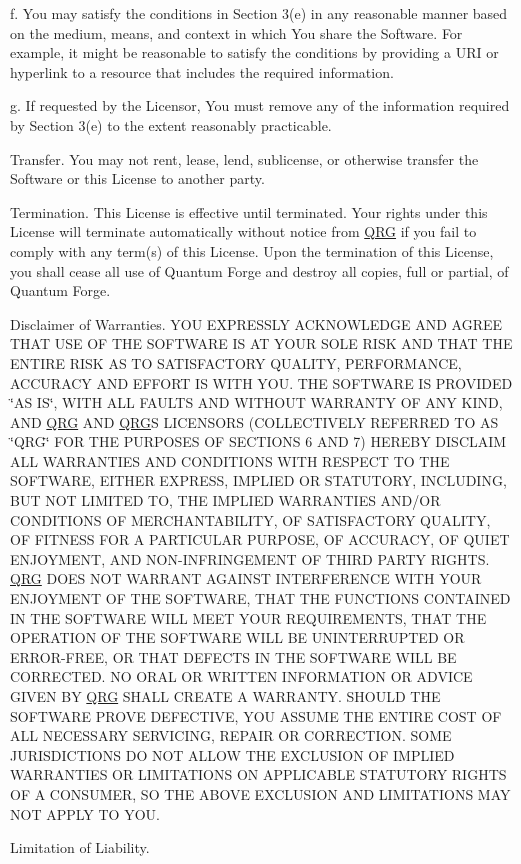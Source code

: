 f. You may satisfy the conditions in Section 3(e) in any reasonable manner based on the medium, means, and context in which You share the Software. For example, it might be reasonable to satisfy the conditions by providing a URI or hyperlink to a resource that includes the required information.

g. If requested by the Licensor, You must remove any of the information required by Section 3(e) to the extent reasonably practicable.


\begin{DoxyEnumerate}
\item Transfer. You may not rent, lease, lend, sublicense, or otherwise transfer the Software or this License to another party.
\item Termination. This License is effective until terminated. Your rights under this License will terminate automatically without notice from \mbox{\hyperlink{namespace_q_r_g}{QRG}} if you fail to comply with any term(s) of this License. Upon the termination of this License, you shall cease all use of Quantum Forge and destroy all copies, full or partial, of Quantum Forge.
\item Disclaimer of Warranties. YOU EXPRESSLY ACKNOWLEDGE AND AGREE THAT USE OF THE SOFTWARE IS AT YOUR SOLE RISK AND THAT THE ENTIRE RISK AS TO SATISFACTORY QUALITY, PERFORMANCE, ACCURACY AND EFFORT IS WITH YOU. THE SOFTWARE IS PROVIDED \char`\"{}\+AS IS\char`\"{}, WITH ALL FAULTS AND WITHOUT WARRANTY OF ANY KIND, AND \mbox{\hyperlink{namespace_q_r_g}{QRG}} AND \mbox{\hyperlink{namespace_q_r_g}{QRG}}\textquotesingle{}S LICENSORS (COLLECTIVELY REFERRED TO AS \char`\"{}\+QRG\char`\"{} FOR THE PURPOSES OF SECTIONS 6 AND 7) HEREBY DISCLAIM ALL WARRANTIES AND CONDITIONS WITH RESPECT TO THE SOFTWARE, EITHER EXPRESS, IMPLIED OR STATUTORY, INCLUDING, BUT NOT LIMITED TO, THE IMPLIED WARRANTIES AND/\+OR CONDITIONS OF MERCHANTABILITY, OF SATISFACTORY QUALITY, OF FITNESS FOR A PARTICULAR PURPOSE, OF ACCURACY, OF QUIET ENJOYMENT, AND NON-\/\+INFRINGEMENT OF THIRD PARTY RIGHTS. \mbox{\hyperlink{namespace_q_r_g}{QRG}} DOES NOT WARRANT AGAINST INTERFERENCE WITH YOUR ENJOYMENT OF THE SOFTWARE, THAT THE FUNCTIONS CONTAINED IN THE SOFTWARE WILL MEET YOUR REQUIREMENTS, THAT THE OPERATION OF THE SOFTWARE WILL BE UNINTERRUPTED OR ERROR-\/\+FREE, OR THAT DEFECTS IN THE SOFTWARE WILL BE CORRECTED. NO ORAL OR WRITTEN INFORMATION OR ADVICE GIVEN BY \mbox{\hyperlink{namespace_q_r_g}{QRG}} SHALL CREATE A WARRANTY. SHOULD THE SOFTWARE PROVE DEFECTIVE, YOU ASSUME THE ENTIRE COST OF ALL NECESSARY SERVICING, REPAIR OR CORRECTION. SOME JURISDICTIONS DO NOT ALLOW THE EXCLUSION OF IMPLIED WARRANTIES OR LIMITATIONS ON APPLICABLE STATUTORY RIGHTS OF A CONSUMER, SO THE ABOVE EXCLUSION AND LIMITATIONS MAY NOT APPLY TO YOU.
\item Limitation of Liability.
\end{DoxyEnumerate}

